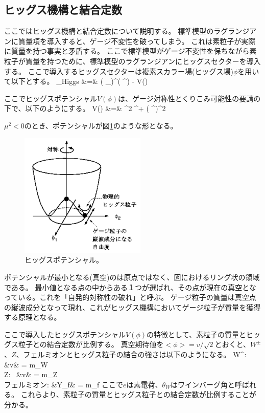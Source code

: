 \subsection{ヒッグス機構と結合定数}

ここではヒッグス機構と結合定数について説明する\cite{1-12}。
標準模型のラグランジアンに質量項を導入すると、ゲージ不変性を破ってしまう。
これは素粒子が実際に質量を持つ事実と矛盾する。
ここで標準模型がゲージ不変性を保ちながら素粒子が質量を持つために、標準模型のラグランジアンにヒッグスセクターを導入する。
ここで導入するヒッグスセクターは複素スカラー場(ヒッグス場)$\phi$を用いて以下とする。
\bbb
\label{higgs_sector}
_{\rm Higgs} &=&  \left( \partial_\mu \phi \right)^\dag \left( \partial^\mu \phi \right) - V(\phi) \\
\eee

ここでヒッグスポテンシャル$V(\phi)$は、ゲージ対称性とくりこみ可能性の要請の下で、以下のようにする。
\bbb
V(\phi)  &=& \mu^2 \phi^\dag \phi + \lambda \left( \phi^\dag \phi \right)^2
\eee

$\mu^2<0$のとき、ポテンシャルが図\ref{higgs_potential}のような形となる。

\begin{figure}[bpt]\centering
\includegraphics[width=6cm]{./higgs_potential.png}
\caption[ヒッグスポテンシャル]{ヒッグスポテンシャル\cite{1-13}。}
\label{higgs_potential}
\end{figure}

ポテンシャルが最小となる(真空)のは原点ではなく、図におけるリング状の領域である。
最小値となる点の中からある１つが選ばれ、その点が現在の真空となっている。これを「自発的対称性の破れ」と呼ぶ。
ゲージ粒子の質量は真空点の縦波成分となって現れ、これがヒッグス機構においてゲージ粒子が質量を獲得する原理となる。

ここで導入したヒッグスポテンシャル$V(\phi)$の特徴として、素粒子の質量とヒッグス粒子との結合定数が比例する。
真空期待値を$<\phi>=v/\sqrt{2}$とおくと、$W^{\pm}$、$Z$、フェルミオンとヒッグス粒子の結合の強さは以下のようになる。
\bbb
W^{\pm}:      &v&    = m_W \\
Z:~           &v& = m_Z \\
フェルミオン: &Y_f&               = m_f 
\eee
ここで$e$は素電荷、$\theta_W$はワインバーグ角と呼ばれる。
これらより、素粒子の質量とヒッグス粒子との結合定数が比例することが分かる。

